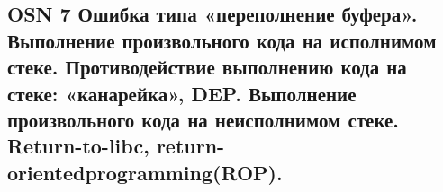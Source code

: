 \subsection{OSN 7 Ошибка типа «переполнение буфера». Выполнение произвольного кода на исполнимом стеке. Противодействие выполнению кода на стеке: «канарейка»,
DEP. Выполнение произвольного кода на неисполнимом стеке. Return-to-libc,
return-orientedprogramming(ROP).}
